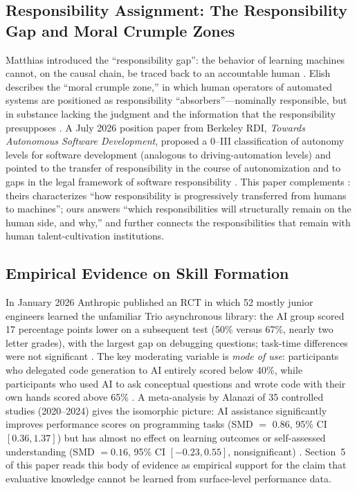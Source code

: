 \documentclass[11pt]{article}
\begin{document}
\subsection{Responsibility Assignment: The Responsibility Gap and Moral
Crumple Zones}
Matthias introduced the ``responsibility gap'': the behavior of learning
machines cannot, on the causal chain, be traced back to an accountable
human \cite{matthias}. Elish describes the ``moral crumple zone,'' in
which human operators of automated systems are positioned as responsibility
``absorbers''---nominally responsible, but in substance lacking the
judgment and the information that the responsibility presupposes
\cite{elish}. A July 2026 position paper from Berkeley RDI, \emph{Towards
Autonomous Software Development}, proposed a 0--III classification of
autonomy levels for software development (analogous to driving-automation
levels) and pointed to the transfer of responsibility in the course of
autonomization and to gaps in the legal framework of software
responsibility \cite{berkeleyrdi}. This paper complements \cite{berkeleyrdi}:
theirs characterizes ``how responsibility is progressively transferred from
humans to machines''; ours answers ``which responsibilities will
structurally remain on the human side, and why,'' and further connects the
responsibilities that remain with human talent-cultivation institutions.

\subsection{Empirical Evidence on Skill Formation}
In January 2026 Anthropic published an RCT in which 52 mostly junior
engineers learned the unfamiliar Trio asynchronous library: the AI group
scored 17 percentage points lower on a subsequent test (50\% versus 67\%,
nearly two letter grades), with the largest gap on debugging questions;
task-time differences were not significant \cite{anthropic_rct}. The key
moderating variable is \emph{mode of use}: participants who delegated code
generation to AI entirely scored below 40\%, while participants who used AI
to ask conceptual questions and wrote code with their own hands scored
above 65\% \cite{anthropic_rct}. A meta-analysis by Alanazi of 35 controlled
studies (2020--2024) gives the isomorphic picture: AI assistance
significantly improves performance scores on programming tasks (SMD $=$
0.86, 95\% CI $[0.36, 1.37]$) but has almost no effect on learning outcomes
or self-assessed understanding (SMD $= 0.16$, 95\% CI $[-0.23, 0.55]$,
nonsignificant) \cite{alanazi}. Section~5 of this paper reads this body of
evidence as empirical support for the claim that evaluative knowledge
cannot be learned from surface-level performance data.
\end{document}
